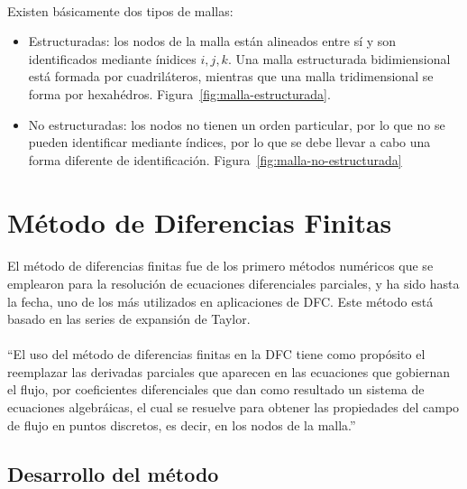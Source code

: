 \documentclass[letterpaper, openright, 12pt]{book}
\begin{document}
    \paragraph*{}
    Existen básicamente dos tipos de mallas:
    \begin{itemize}
    \item Estructuradas: los nodos de la malla están alineados entre sí y
      son identificados mediante ínidices $i, j, k$. Una malla estructurada
      bidimiensional está formada por cuadriláteros, mientras que una malla
      tridimensional se forma por hexahédros. Figura~\ref{fig:malla-estructurada}.
    \item No estructuradas: los nodos no tienen un orden particular, por lo
      que no se pueden identificar mediante índices, por lo que se debe llevar a
      cabo una forma diferente de identificación. Figura~\ref{fig:malla-no-estructurada}
    \end{itemize}


    \section{Método de Diferencias Finitas}
    \paragraph*{}
    El método de diferencias finitas fue de los primero métodos numéricos
    que se emplearon para la resolución de ecuaciones diferenciales
    parciales, y ha sido hasta la fecha, uno de los más utilizados en
    aplicaciones de DFC\@. Este método está basado en las series de expansión
    de Taylor.

    \paragraph*{}
    ``El uso del método de diferencias finitas en la DFC tiene como propósito el
    reemplazar las derivadas parciales que aparecen en las ecuaciones que
    gobiernan el flujo, por coeficientes diferenciales que dan como resultado un
    sistema de ecuaciones algebráicas, el cual se resuelve para obtener las
    propiedades del campo de flujo en puntos discretos, es decir, en los nodos
    de la malla.'' \cite{anderson-yotros}

    \subsection{Desarrollo del método}
\end{document}
